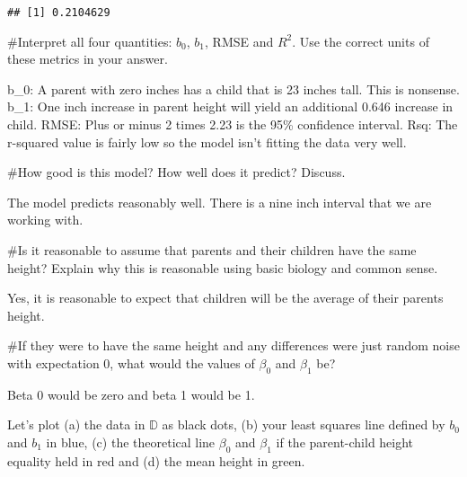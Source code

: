 \documentclass[
]{article}
\begin{document}
\begin{verbatim}
## [1] 0.2104629
\end{verbatim}

\#Interpret all four quantities: \(b_0\), \(b_1\), RMSE and \(R^2\). Use
the correct units of these metrics in your answer.

b\_0: A parent with zero inches has a child that is 23 inches tall. This
is nonsense. b\_1: One inch increase in parent height will yield an
additional 0.646 increase in child. RMSE: Plus or minus 2 times 2.23 is
the 95\% confidence interval. Rsq: The r-squared value is fairly low so
the model isn't fitting the data very well.

\#How good is this model? How well does it predict? Discuss.

The model predicts reasonably well. There is a nine inch interval that
we are working with.

\#Is it reasonable to assume that parents and their children have the
same height? Explain why this is reasonable using basic biology and
common sense.

Yes, it is reasonable to expect that children will be the average of
their parents height.

\#If they were to have the same height and any differences were just
random noise with expectation 0, what would the values of \(\beta_0\)
and \(\beta_1\) be?

Beta 0 would be zero and beta 1 would be 1.

Let's plot (a) the data in \(\mathbb{D}\) as black dots, (b) your least
squares line defined by \(b_0\) and \(b_1\) in blue, (c) the theoretical
line \(\beta_0\) and \(\beta_1\) if the parent-child height equality
held in red and (d) the mean height in green.
\end{document}
